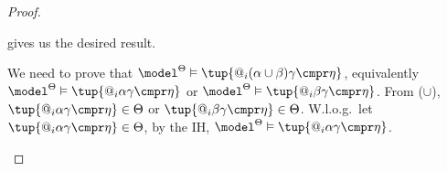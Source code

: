\begin{proof}
\begin{description}
\begin{description}
                 gives us the desired result.
            \item[($\varphi = \tup{@_i (\alpha \cup \beta) \gamma \cmpr \eta}$)]
                We need to prove that $\model^\Theta \vDash \tup{@_i (\alpha \cup \beta) \gamma \cmpr \eta}$, equivalently $\model^\Theta \vDash \tup{@_i\alpha\gamma \cmpr \eta}$ or $\model^\Theta \vDash \tup{@_i \beta\gamma \cmpr \eta}$.
                From ($\cup$), $\tup{@_i\alpha\gamma \cmpr \eta} \in \Theta$ or $\tup{@_i\beta\gamma \cmpr \eta} \in \Theta$.
                W.l.o.g.\ let $\tup{@_i\alpha\gamma \cmpr \eta} \in \Theta$, by the IH, $\model^{\Theta} \vDash \tup{@_i\alpha\gamma \cmpr \eta}$.

\end{description}
\end{description}
\end{proof}
